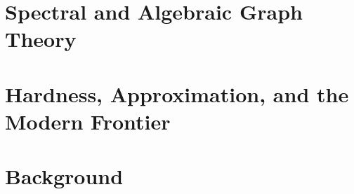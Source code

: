 \documentclass[11pt]{book}
\begin{document}
\part{Spectral and Algebraic Graph Theory}







\part{Hardness, Approximation, and the Modern Frontier}






\part{Background}

\end{document}
